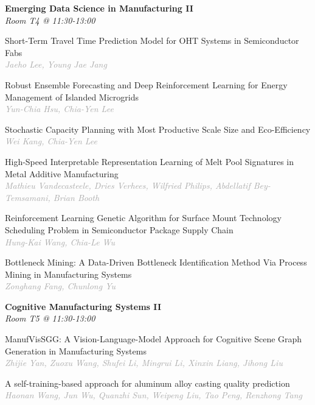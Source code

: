 \begin{multicols*}{2}
\normalsize \textbf{Emerging Data Science in Manufacturing II}\\
\small \textit{Room T4 @ 11:30-13:00}

\small Short-Term Travel Time Prediction Model for OHT Systems in Semiconductor Fabs\\ 
\footnotesize \textcolor{darkgray}{\textit{Jaeho Lee, Young Jae  Jang}}

\small Robust Ensemble Forecasting and Deep Reinforcement Learning for Energy Management of Islanded Microgrids\\ 
\footnotesize \textcolor{darkgray}{\textit{Yun-Chia Hsu, Chia-Yen  Lee}}

\small Stochastic Capacity Planning with Most Productive Scale Size and Eco-Efficiency\\ 
\footnotesize \textcolor{darkgray}{\textit{Wei Kang, Chia-Yen  Lee}}

\small High-Speed Interpretable Representation Learning of Melt Pool Signatures in Metal Additive Manufacturing\\ 
\footnotesize \textcolor{darkgray}{\textit{Mathieu Vandecasteele, Dries  Verhees, Wilfried  Philips, Abdellatif  Bey-Temsamani, Brian  Booth}}

\small Reinforcement Learning Genetic Algorithm for Surface Mount Technology Scheduling Problem in Semiconductor Package Supply Chain\\ 
\footnotesize \textcolor{darkgray}{\textit{Hung-Kai Wang, Chia-Le  Wu}}

\small Bottleneck Mining: A Data-Driven Bottleneck Identification Method Via Process Mining in Manufacturing Systems\\ 
\footnotesize \textcolor{darkgray}{\textit{Zonghang Fang, Chunlong  Yu}}

\normalsize \textbf{Cognitive Manufacturing Systems II}\\
\small \textit{Room T5 @ 11:30-13:00}

\small ManufVisSGG: A Vision-Language-Model Approach for Cognitive Scene Graph Generation in Manufacturing Systems\\ 
\footnotesize \textcolor{darkgray}{\textit{Zhijie Yan, Zuoxu  Wang, Shufei  Li, Mingrui  Li, Xinxin  Liang, Jihong  Liu}}

\small A self-training-based approach for aluminum alloy casting quality prediction\\ 
\footnotesize \textcolor{darkgray}{\textit{Haonan Wang, Jun  Wu, Quanzhi  Sun, Weipeng  Liu, Tao  Peng, Renzhong  Tang}}


\end{multicols*}

